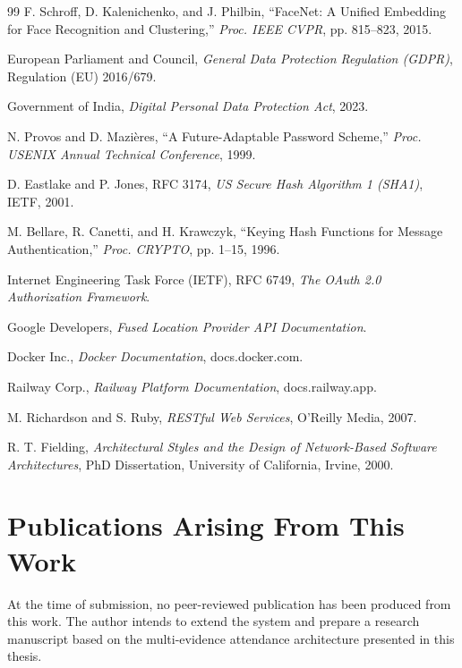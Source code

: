 \documentclass[12pt, a4paper, oneside]{report}
\begin{document}
\begin{thebibliography}{99}
 F. Schroff, D. Kalenichenko, and J. Philbin, ``FaceNet: A Unified Embedding for Face Recognition and Clustering,'' \textit{Proc. IEEE CVPR}, pp. 815--823, 2015.

 European Parliament and Council, \textit{General Data Protection Regulation (GDPR)}, Regulation (EU) 2016/679.

 Government of India, \textit{Digital Personal Data Protection Act}, 2023.

 N. Provos and D. Mazi\`{e}res, ``A Future-Adaptable Password Scheme,'' \textit{Proc. USENIX Annual Technical Conference}, 1999.

 D. Eastlake and P. Jones, RFC 3174, \textit{US Secure Hash Algorithm 1 (SHA1)}, IETF, 2001.

 M. Bellare, R. Canetti, and H. Krawczyk, ``Keying Hash Functions for Message Authentication,'' \textit{Proc. CRYPTO}, pp. 1--15, 1996.

 Internet Engineering Task Force (IETF), RFC 6749, \textit{The OAuth 2.0 Authorization Framework}.

 Google Developers, \textit{Fused Location Provider API Documentation}.

 Docker Inc., \textit{Docker Documentation}, docs.docker.com.

 Railway Corp., \textit{Railway Platform Documentation}, docs.railway.app.

 M. Richardson and S. Ruby, \textit{RESTful Web Services}, O'Reilly Media, 2007.

 R. T. Fielding, \textit{Architectural Styles and the Design of Network-Based Software Architectures}, PhD Dissertation, University of California, Irvine, 2000.

\end{thebibliography}

\chapter*{Publications Arising From This Work}

At the time of submission, no peer-reviewed publication has been produced from this work. The author intends to extend the system and prepare a research manuscript based on the multi-evidence attendance architecture presented in this thesis.
\end{document}
